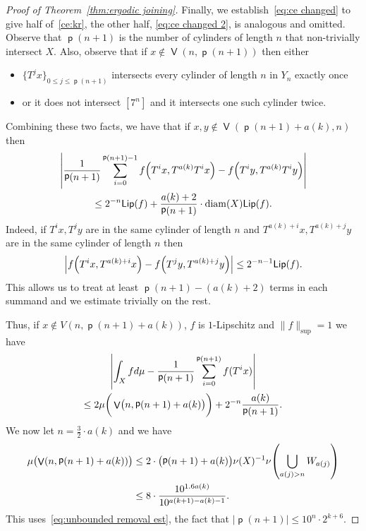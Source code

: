 \documentclass[AHL,Unicode,longabstracts,published]{cedram}
\DeclareMathOperator{\bad}{\mathsf{V}}
\DeclareMathOperator{\p}{\mathsf{p}}
\DeclareMathOperator{\diam}{diam}
\newcommand{\Lip}{\mathsf{Lip}}
\let\originalleft\left
\let\originalright\right
\renewcommand{\left}{\mathopen{}\mathclose\bgroup\originalleft}
\renewcommand{\right}{\aftergroup\egroup\originalright}
\begin{document}
\begin{proof}[Proof of Theorem~\ref{thm:ergodic joining}]
Finally, we establish~\eqref{eq:ce changed} to give half of~\eqref{ce:kr}, the other half, \eqref{eq:ce changed 2}, is analogous and omitted. Observe that $\p(n+1)$ is the number of cylinders of length $n$ that non-trivially intersect $X$. Also, observe that if $x \notin \bad(n,\p(n+1))$ then either
\begin{itemize}
\item $\{T^jx\}_{0\leq j \leq \p(n+1)}$ intersects every cylinder of length $n$ in $Y_n$ exactly once
\item or it does not intersect $[7^n]$ and it intersects one such cylinder twice.
\end{itemize}
Combining these two facts, we have that if $x,y \notin \bad(\p(n+1)+a(k),n) $ then
\begin{multline}\label{eq:pair sum close}
\left|\frac{1}{\p(n+1)}\sum_{i=0}^{\p(n+1)-1} f\left(T^ix,T^{a(k)}T^ix\right)-f\left(T^iy,T^{a(k)}T^iy\right) \right|\\
\leq 2^{-n}\Lip(f)+\frac {a(k)+2} {\p(n+1)}\cdot \diam(X) \Lip(f).
\end{multline}
Indeed, if $T^ix,T^jy$ are in the same cylinder of length $n$ and $T^{a(k)+i}x,T^{a(k)+j}y$ are in the same cylinder of length $n$ then
\[
\left|f\left(T^ix,T^{a(k)+i}x\right)-f\left(T^jy,T^{a(k)+j}y\right)\right|\leq 2^{-n-1}\Lip(f).
\]
This allows us to treat at least $\p(n+1)-(a(k)+2)$ terms in each summand and we estimate trivially on the rest.

Thus, if $x \notin V(n,\p(n+1)+a(k))$, $f$ is $1$-Lipschitz and $\|f\|_{\sup}=1$ we have
\begin{multline}\label{eq:for kr}
\left|\int_X f d\mu-\frac 1 {\p(n+1)}\sum_{i=0}^{\p(n+1)}f(T^ix) \right|\\
\leq 2\mu\bigg(\bad\bigl(n,\p(n+1)+a(k)\bigr)\bigg)+2^{-n}\frac {a(k)} {\p(n+1)}.
\end{multline}
We now let $n=\frac 3 2 \cdot a(k)$ and we have
\begin{equation}\label{eq:bad set bound}
\begin{aligned}
\mu\bigl(\bad\left(n,\p(n+1)+a(k)\right)\bigr) &\leq 2 \cdot \bigl(\p(n+1)+a(k)\bigr) \nu(X)^{-1}\nu\left(\bigcup_{a(j)>n}W_{a(j)}\right)\\ 
&\leq 8 \cdot \frac{10^{1.6a(k)}}{10^{a(k+1)-a(k)-1}}.
\end{aligned}
\end{equation}
This uses~\eqref{eq:unbounded removal est}, the fact that $|\p(n+1)|\leq 10^n \cdot 2^{k+6}.$


\end{proof}
\end{document}
